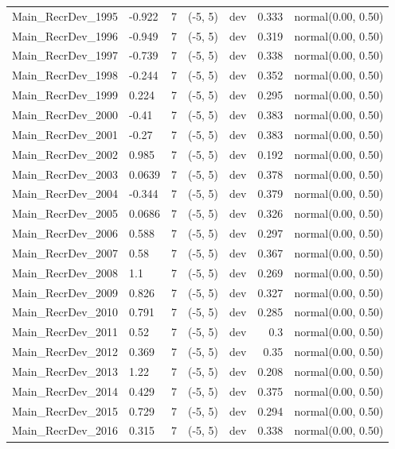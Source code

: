 \documentclass[
  english,
]{article}
\begin{document}
\begin{landscape}
\begin{longtable}{llrllrl}
Main\_RecrDev\_1995 & -0.922 & 7 & (-5, 5) & dev & 0.333 & normal(0.00, 0.50) \\ 
Main\_RecrDev\_1996 & -0.949 & 7 & (-5, 5) & dev & 0.319 & normal(0.00, 0.50) \\ 
Main\_RecrDev\_1997 & -0.739 & 7 & (-5, 5) & dev & 0.338 & normal(0.00, 0.50) \\ 
Main\_RecrDev\_1998 & -0.244 & 7 & (-5, 5) & dev & 0.352 & normal(0.00, 0.50) \\ 
Main\_RecrDev\_1999 & 0.224 & 7 & (-5, 5) & dev & 0.295 & normal(0.00, 0.50) \\ 
Main\_RecrDev\_2000 & -0.41 & 7 & (-5, 5) & dev & 0.383 & normal(0.00, 0.50) \\ 
Main\_RecrDev\_2001 & -0.27 & 7 & (-5, 5) & dev & 0.383 & normal(0.00, 0.50) \\ 
Main\_RecrDev\_2002 & 0.985 & 7 & (-5, 5) & dev & 0.192 & normal(0.00, 0.50) \\ 
Main\_RecrDev\_2003 & 0.0639 & 7 & (-5, 5) & dev & 0.378 & normal(0.00, 0.50) \\ 
Main\_RecrDev\_2004 & -0.344 & 7 & (-5, 5) & dev & 0.379 & normal(0.00, 0.50) \\ 
Main\_RecrDev\_2005 & 0.0686 & 7 & (-5, 5) & dev & 0.326 & normal(0.00, 0.50) \\ 
Main\_RecrDev\_2006 & 0.588 & 7 & (-5, 5) & dev & 0.297 & normal(0.00, 0.50) \\ 
Main\_RecrDev\_2007 & 0.58 & 7 & (-5, 5) & dev & 0.367 & normal(0.00, 0.50) \\ 
Main\_RecrDev\_2008 & 1.1 & 7 & (-5, 5) & dev & 0.269 & normal(0.00, 0.50) \\ 
Main\_RecrDev\_2009 & 0.826 & 7 & (-5, 5) & dev & 0.327 & normal(0.00, 0.50) \\ 
Main\_RecrDev\_2010 & 0.791 & 7 & (-5, 5) & dev & 0.285 & normal(0.00, 0.50) \\ 
Main\_RecrDev\_2011 & 0.52 & 7 & (-5, 5) & dev & 0.3 & normal(0.00, 0.50) \\ 
Main\_RecrDev\_2012 & 0.369 & 7 & (-5, 5) & dev & 0.35 & normal(0.00, 0.50) \\ 
Main\_RecrDev\_2013 & 1.22 & 7 & (-5, 5) & dev & 0.208 & normal(0.00, 0.50) \\ 
Main\_RecrDev\_2014 & 0.429 & 7 & (-5, 5) & dev & 0.375 & normal(0.00, 0.50) \\ 
Main\_RecrDev\_2015 & 0.729 & 7 & (-5, 5) & dev & 0.294 & normal(0.00, 0.50) \\ 
Main\_RecrDev\_2016 & 0.315 & 7 & (-5, 5) & dev & 0.338 & normal(0.00, 0.50) \\ 

\end{longtable}
\end{landscape}
\end{document}
